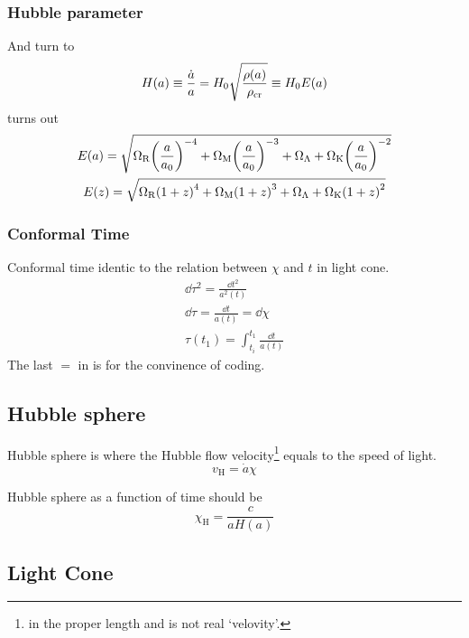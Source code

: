 \subsubsection{Hubble parameter}
And turn  to 
\begin{equation}
    H(a) \equiv \frac{\dot{a}}{a} = H_0 \sqrt{\frac{\rho(a)}{\rho_{\mathrm{cr}}}} \equiv H_0 E(a)
\end{equation}
 turns out 
\begin{gather}
    E(a) = \sqrt{\Omega_{\mathrm{R}} {\qty(\frac{a}{a_0})}^{-4} + \Omega_{\mathrm{M}} {\qty(\frac{a}{a_0})}^{-3} + \Omega_\Lambda + \Omega_{\mathrm{K}} {\qty(\frac{a}{a_0})}^{-2}} \\ 
    E(z) = \sqrt{\Omega_{\mathrm{R}} {\qty(1+z)}^{4} + \Omega_{\mathrm{M}} {\qty(1+z)}^{3} + \Omega_\Lambda + \Omega_{\mathrm{K}} {\qty(1+z)}^{2}} 
\end{gather}

\subsubsection{Conformal Time}

Conformal time identic to the relation between $\chi$ and $t$ in light cone.
\begin{gather}
    \dd \tau^2 = \frac{\dd t^2}{a^2(t)} \\ 
    \dd \tau = \frac{\dd t}{a(t)} = \dd \chi \label{eq:dtau}\\ 
    \tau(t_1) = \int_{t_i}^{t_1} \frac{\dd t}{a(t)}
\end{gather}
The last $=$ in  is for the convinence of coding.

\subsection{Hubble sphere}

Hubble sphere is where the Hubble flow velocity\footnote{in the proper length and is not real `velovity'.} equals to the speed of light. 
\begin{equation}
    v_{\mathrm{H}} = \dot{a} \chi  
\end{equation}


Hubble sphere as a function of time should be 
\begin{equation}
    \chi_{\mathrm{H}} =\frac{c}{a H(a)}
\end{equation}

\subsection{Light Cone}

